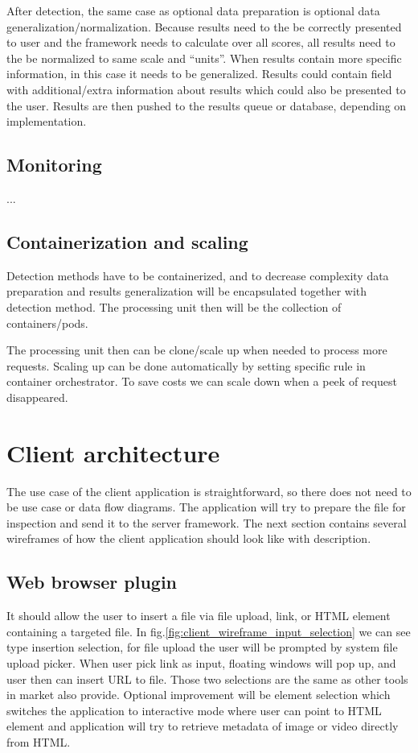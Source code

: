 After detection, the same case as optional data preparation is optional data generalization/normalization. Because results need to the be correctly presented to user and the framework needs to calculate over all scores, all results need to the be normalized to same scale and “units”. When results contain more specific information, in this case it needs to be generalized. Results could contain field with additional/extra information about results which could also be presented to the user. Results are then pushed to the results queue or database, depending on implementation.

\section{Monitoring}
...

\section{Containerization and scaling}

Detection methods have to be containerized, and to decrease complexity data preparation and results generalization will be encapsulated together with detection method. The processing unit then will be the collection of containers/pods.

The processing unit then can be clone/scale up when needed to process more requests. Scaling up can be done automatically by setting specific rule in container orchestrator. To save costs we can scale down when a peek of request disappeared.

\chapter{Client architecture}

The use case of the client application is straightforward, so there does not need to be use case or data flow diagrams. The application will try to prepare the file for inspection and send it to the server framework. The next section contains several wireframes of how the client application should look like with description.

\section{Web browser plugin}

It should allow the user to insert a file via file upload, link, or HTML element containing a targeted file. In fig.\ref{fig:client_wireframe_input_selection} we can see type insertion selection, for file upload the user will be prompted by system file upload picker. When user pick link as input, floating windows will pop up, and user then can insert URL to file. Those two selections are the same as other tools in market also provide. Optional improvement will be element selection which switches the application to interactive mode where user can point to HTML element and application will try to retrieve metadata of image or video directly from HTML. 

